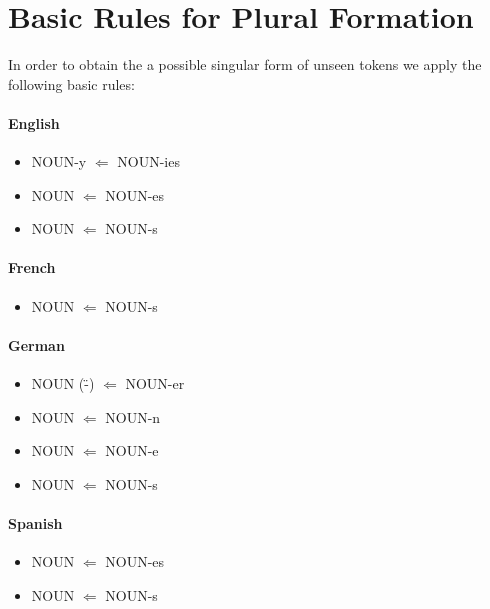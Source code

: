 \documentclass[a4paper,11pt]{article}
\begin{document}
	\appendix
	\section{Basic Rules for Plural Formation}
	\label{ap:plural}
	
	In order to obtain the a possible singular form of unseen tokens we apply the following basic rules:
	
	\renewcommand{\labelitemi}{$\star$}
	\paragraph{English}
	\begin{itemize}
		\itemsep-0.2em 
		\item NOUN-y $\Leftarrow$ NOUN-ies
		\item NOUN $\Leftarrow$ NOUN-es
		\item NOUN $\Leftarrow$ NOUN-s
	\end{itemize}
	
	\paragraph{French}
	\begin{itemize}
		\itemsep-0.2em 
		\item NOUN $\Leftarrow$ NOUN-s
	\end{itemize}
	
	\paragraph{German}
	\begin{itemize}
		\itemsep-0.2em 
		\item NOUN (\"-) $\Leftarrow$ NOUN-er
		\item NOUN $\Leftarrow$ NOUN-n
		\item NOUN $\Leftarrow$ NOUN-e
		\item NOUN $\Leftarrow$ NOUN-s
	\end{itemize}
	
	\paragraph{Spanish}
	\begin{itemize}
		\itemsep-0.2em 
		\item NOUN $\Leftarrow$ NOUN-es
		\item NOUN $\Leftarrow$ NOUN-s
	\end{itemize}
	
\end{document}
